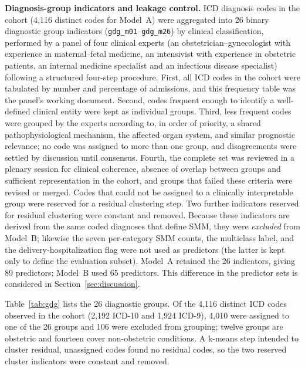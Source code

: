 \documentclass[healthcare,article,submit,pdftex,moreauthors]{Definitions/mdpi}
\begin{document}
\textbf{Diagnosis-group indicators and leakage control.} ICD diagnosis codes in the
cohort (4{,}116 distinct codes for Model~A) were aggregated into 26 binary diagnostic
group indicators (\texttt{gdg\_m01}--\texttt{gdg\_m26}) by clinical classification, performed by a panel of four clinical experts (an obstetrician--gynecologist with experience in maternal--fetal medicine, an intensivist with experience in obstetric patients, an internal medicine specialist and an infectious disease specialist) following a structured four-step procedure.
First, all ICD codes in the cohort were tabulated by number and percentage of admissions, and this frequency table
was the panel's working document. Second, codes frequent enough to identify a well-defined clinical
entity were kept as individual groups. Third, less frequent codes were grouped by the experts according to,
in order of priority, a shared pathophysiological mechanism, the affected organ system, and similar
prognostic relevance; no code was assigned to more than one group, and disagreements were settled by discussion
until consensus. Fourth, the complete set was reviewed in a plenary session for clinical coherence, absence of
overlap between groups and sufficient representation in the cohort, and groups that failed these criteria were revised or merged.
Codes that could not be assigned to a clinically interpretable group were reserved for a residual clustering step.
Two further indicators reserved for residual clustering were constant and removed.
Because these indicators are derived from the same coded diagnoses that
define SMM, they were \emph{excluded} from Model~B; likewise the seven per-category
SMM counts, the multiclass label, and the delivery-hospitalization flag were not
used as predictors (the latter is kept only to define the evaluation subset).
Model~A retained the 26 indicators, giving 89 predictors; Model~B used 65 predictors.
This difference in the predictor sets is considered in Section~\ref{sec:discussion}.

Table~\ref{tab:gdg} lists the 26 diagnostic groups. Of the 4{,}116 distinct ICD codes
observed in the cohort (2{,}192 ICD-10 and 1{,}924 ICD-9), 4{,}010 were assigned to one
of the 26 groups and 106 were excluded from grouping; twelve groups are obstetric and
fourteen cover non-obstetric conditions. A k-means step intended to cluster residual,
unassigned codes found no residual codes, so the two reserved cluster indicators were
constant and removed.
\end{document}

